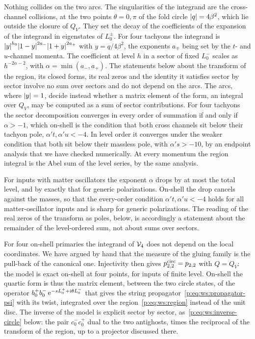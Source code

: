 Nothing collides on the two arcs.
The singularities of the integrand are the cross-channel collisions, at the two points $\theta = 0, \pi$ of the fold circle ${|q|} = 4 \beta^2$, which lie outside the closure of $Q_V$.
They set the decay of the coefficients of the expansion of the integrand in eigenstates of $L_0^\pm$.
For four tachyons the integrand is ${|y|}^{h_0} {|1 - y|}^{2 a_-} {|1 + y|}^{2 a_+}$ with $y = q / 4 \beta^2$, the exponents $a_\mp$ being set by the $t$- and $u$-channel momenta.
  The coefficient at level $h$ in a sector of fixed $L_0^-$ scales as $h^{- 2 \alpha - 2}$, with $\alpha = \min (a_-, a_+)$.
The statements below about the transform of the region, its closed forms, its real zeros and the identity it satisfies sector by sector involve no sum over sectors and do not depend on the arcs.
The arcs, where ${|y|} = 1$, decide instead whether a matrix element of the form, an integral over $Q_V$, may be computed as a sum of sector contributions.
For four tachyons the sector decomposition converges in every order of summation if and only if $\alpha > - 1$, which on-shell is the condition that both cross channels sit below their tachyon pole, $\alpha' t, \alpha' u < - 4$.
In level order it converges under the weaker condition that both sit below their massless pole, with $\alpha' s > - 10$, by an endpoint analysis that we have checked numerically.
At every momentum the region integral is the Abel sum of the level series, by the same analysis.

For inputs with matter oscillators the exponent $\alpha$ drops by at most the total level, and by exactly that for generic polarizations.
On-shell the drop cancels against the masses, so that the every-order condition $\alpha' t, \alpha' u < - 4$ holds for all matter-oscillator inputs and is sharp for generic polarizations.
The reading of the real zeros of the transform as poles, below, is accordingly a statement about the remainder of the level-ordered sum, not about sums over sectors.

For four on-shell primaries the integrand of $\mathcal{V}_{4}$ does not depend on the local coordinates.
  We have argued by hand that the measure of the gluing family is the pull-back of the canonical one.
Injectivity then gives $p_{2,2}^{\mathrm{circ}} = p_{2,2}$ with $Q = Q_V$: the model is exact on-shell at four points, for inputs of finite level.
On-shell the quartic form is thus the matrix element, between the two circle states, of the operator $b_0^+ b_0^- \, \mathrm{e}^{- s L_0^+ + \mathrm{i} \theta L_0^-}$ that gives the string propagator~\eqref{p:eq:ws:propagator-psi} with its twist, integrated over the region~\eqref{p:eq:ws:region} instead of the unit disc.
  The inverse of the model is explicit sector by sector, as~\eqref{p:eq:ws:inverse-circle} below: the pair $c_0^- c_0^+$ dual to the two antighosts, times the reciprocal of the transform of the region, up to a projector discussed there.

